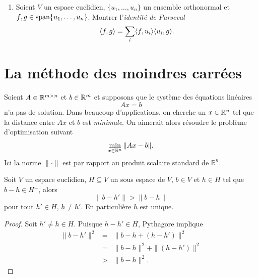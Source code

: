 \begin{enumerate}
\begin{enumerate}[i)]
  \item Soit $V$ le sous-espace engendré par $f(x) = x$ et $g(x) = x^2$. Trouver une base orthonormale de $V$. 
  \item Soit $V$ le sous-espace engendré par $\{1,x,x^2\}$. Trouver une base orthonormale de $V$. 
  \end{enumerate}
\item Soient $V$ un espace euclidien, $\{u_1,\dots,u_n\}$ un ensemble orthonormal et $f,g \in \operatorname{span}\{u_1,\dots,u_n\}$. Montrer l'\emph{identité de Parseval}
  \begin{displaymath}
    \langle {f,g} \rangle = \sum_i \langle {f,u_i} \rangle\langle {u_i,g} \rangle. 
  \end{displaymath}
\end{enumerate}


\section{La méthode des moindres carrées} 
\label{sec:le-methode-des}

Soient $A \in \mathbb{R}^{m \times n} $ et $b \in \mathbb{R}^m$ et supposons  que le système des équations linéaires 
\begin{equation}
  \label{m:eq:2}
  Ax = b
\end{equation}
n'a pas de solution. Dans beaucoup d'applications, on cherche un $x \in \mathbb{R}^n$ tel que la distance entre  $Ax$ et $b$ est \emph{minimale}. On aimerait alors résoudre le problème d'optimisation suivant
\begin{equation}
  \label{eq:3}
  \min_{x \in \mathbb{R}^n} \|Ax - b\|. 
\end{equation}
Ici la norme $\|⋅\|$ est par rapport au produit scalaire standard de $ℝ^n$.  



\begin{lemma}
  \label{lem:26}
  Soit  $V$ un espace euclidien, $H ⊆ V$ un sous espace de $V$, $b ∈ V$ et $h ∈ H$ tel que $b-h ∈ H^⊥$, alors
  \begin{displaymath}
    \|b- h' \| >  \|b-h\| 
  \end{displaymath}
  pour tout $h' ∈ H$, $h ≠ h'$. En particulière $h$ est unique. 
\end{lemma}

\begin{proof}
  Soit $h' ≠ h ∈ H$. Puisque $h - h' ∈ H$, Pythagore  implique 
  \begin{eqnarray*}
    \| b - h' \|^2 & = & \| b - h + ( h- h') \|^2 \\
                   & = & \| b - h\| ^2  + \| ( h- h') \|^2\\ 
                   & > &       \| b - h\| ^2. 
  \end{eqnarray*}
  
\end{proof}

